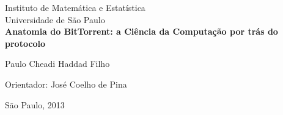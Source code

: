 \documentclass[a4paper, 11pt, oneside, brazil]{book}
\begin{document}
\thispagestyle{empty}
\begin{center}
	\large
		Instituto de Matemática e Estatística\\
		Universidade de São Paulo\\[-0.25cm]

	\vspace*{5.5cm}
	\textbf{\Large Anatomia do BitTorrent: a Ciência da Computação por trás do protocolo}

	\vspace*{2.0cm}

	\Large{Paulo Cheadi Haddad Filho} 

	\vskip 0.6cm
	Orientador: José Coelho de Pina

	\vspace*{\fill}
	\normalsize{São Paulo, 2013}
\end{center}

\pagebreak


\pagebreak



\tableofcontents
\addcontentsline{}{}{}
\pagebreak

\listoffigures  %

\begin{comment}
	\setstretch{1.5}  %
	\clearpage  %

	\listofsymbols{ll}  %
	{

	}
\end{comment}

\clearpage

\addtolength{\parskip}{\baselineskip}


\end{document}
